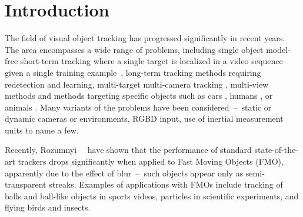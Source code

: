 \documentclass[10pt,twocolumn,letterpaper]{article}
\begin{document}
\section{Introduction}
\label{sec:Intro}
The field of visual object tracking has progressed significantly in recent years. The area encompasses a wide range of problems, including single object model-free short-term tracking where a single target is localized in a video sequence given a single training example~\cite{otb,vot2016,VOT_TPAMI,vot2018}, long-term tracking methods requiring redetection and learning\cite{kalal2012tracking,uav_benchmark_eccv2016,moudgil2017long,tao2017tracking}, multi-target multi-camera tracking \cite{RistaniSZCT16}, multi-view methods \cite{KroegerDG14} and methods targeting specific objects such as cars \cite{betke2000real}, humans \cite{mittal2003m}, or animals \cite{fry2000tracking}. Many variants of the problems have been considered~--~static or dynamic cameras or environments, RGBD input, use of inertial measurement units to name a few.

Recently, Rozumnyi~\etal~\cite{fmo} have shown that the performance of standard state-of-the-art trackers drops significantly when applied to Fast Moving Objects (FMO), apparently due to the effect of blur~--~such objects appear only as semi-transparent streaks. Examples of applications with FMOs include tracking of balls and ball-like objects in sports videos, particles in scientific experiments, and flying birds and insects.
\end{document}
